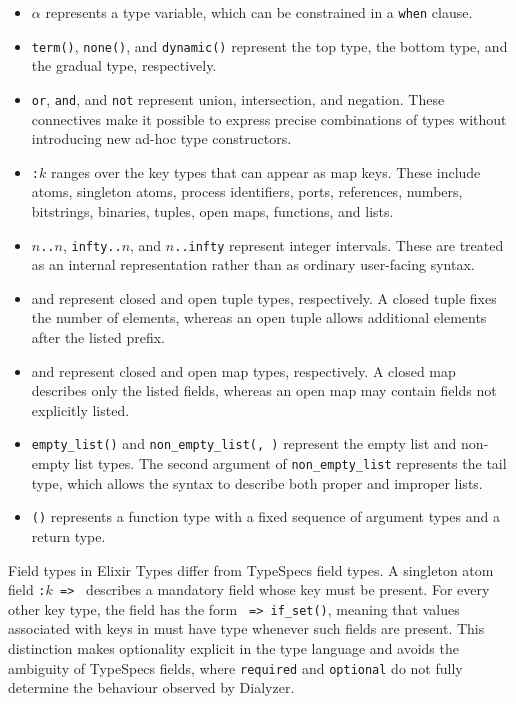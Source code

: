 \begin{itemize}
    \item \texttt{$\alpha$}
    represents a type variable, which can be constrained in a \texttt{when} clause.
    \item \texttt{term()}, \texttt{none()}, and \texttt{dynamic()}
    represent the top type, the bottom type, and the gradual type, respectively.
    \item \texttt{or}, \texttt{and}, and \texttt{not}
    represent union, intersection, and negation.
    These connectives make it possible to express precise combinations of types without introducing new ad-hoc type constructors.
    \item \texttt{:$k$}
    ranges over the key types that can appear as map keys.
    These include atoms, singleton atoms, process identifiers, ports, references, numbers, bitstrings, binaries, tuples, open maps, functions, and lists.
    \item \texttt{$n$..$n$}, \texttt{infty..$n$}, and \texttt{$n$..infty}
    represent integer intervals.
    These are treated as an internal representation rather than as ordinary user-facing syntax.
    \item \tuple{\ov{\ETT}} and 
    represent closed and open tuple types, respectively.
    A closed tuple fixes the number of elements, whereas an open tuple allows additional elements after the listed prefix.
    \item \map{\ov{\ETF}} and 
    represent closed and open map types, respectively.
    A closed map describes only the listed fields, whereas an open map may contain fields not explicitly listed.
    \item \texttt{empty\_list()} and \texttt{non\_empty\_list(\ETT, \ETT)}
    represent the empty list and non-empty list types.
    The second argument of \texttt{non\_empty\_list} represents the tail type, which allows the syntax to describe both proper and improper lists.
    \item \texttt{(\fun{$\ov{\ETT}$}{\ETT})}
    represents a function type with a fixed sequence of argument types and a return type.
\end{itemize}

Field types in Elixir Types differ from TypeSpecs field types.
A singleton atom field \texttt{:$k$\,=>\,\ETT} describes a mandatory field whose key must be present.
For every other key type, the field has the form \texttt{\ETK\,=>\,if\_set(\ETT)}, meaning that values associated with keys in \ETK{} must have type \ETT{} whenever such fields are present.
This distinction makes optionality explicit in the type language and avoids the ambiguity of TypeSpecs fields, where \texttt{required} and \texttt{optional} do not fully determine the behaviour observed by Dialyzer.


